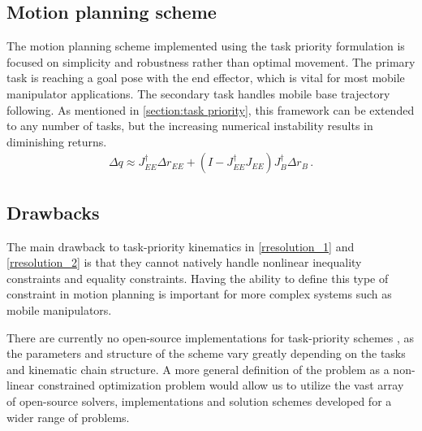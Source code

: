 \documentclass[times, utf8, diplomski, english]{fer}
\begin{document}
\subsection{Motion planning scheme}
The motion planning scheme implemented using the task priority formulation is focused on simplicity and robustness rather than optimal movement.
The primary task is reaching a goal pose with the end effector, which is vital for most mobile manipulator applications. 
The secondary task handles mobile base trajectory following.
As mentioned in \autoref{section:task priority}, this framework can be extended to any number of tasks, but the increasing numerical instability results in diminishing returns.
\begin{align}
\label{rresolution_3}
\Delta q \approx J_{EE}^{\dagger}\Delta r_{EE} + \left(I - J_{EE}^{\dagger}J_{EE}\right)J_{B}^{\dagger}\Delta r_{B}\, .
\end{align}

\subsection{Drawbacks}\label{subsec:tp drawbacks}
The main drawback to task-priority kinematics in \eqref{rresolution_1} and \eqref{rresolution_2} is that they cannot natively handle nonlinear inequality constraints \citep{moe2016set} and equality constraints. 
Having the ability to define this type of constraint in motion planning is important for more complex systems such as mobile manipulators.

There are currently no open-source implementations for task-priority schemes , as the parameters and structure of the 
scheme vary greatly depending on the tasks and kinematic chain structure.
A more general definition of the problem as a non-linear constrained optimization problem would allow us to utilize the vast array of open-source solvers, implementations and solution schemes developed for a wider range of problems.
\end{document}
